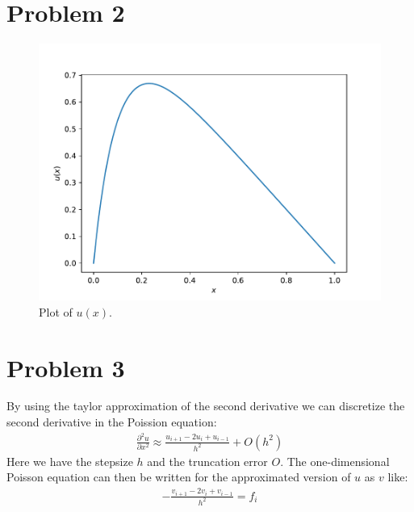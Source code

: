 \documentclass[english,notitlepage]{revtex4-1}  %
\begin{document}
\section*{Problem 2}
\begin{figure}[H]
  \includegraphics{../figures/x_u_plot.pdf}
  \caption{Plot of $u(x)$.}
  \label{tab:output_table}
\end{figure}

\section*{Problem 3}
By using the taylor approximation of the second derivative we can discretize the second derivative in the Poission equation:
\begin{align*}
  \frac{\partial^2 u }{\partial x^2} \approx \frac{u_{i+1} - 2 u_i + u_{i-1}}{h^2} + O(h^2)
\end{align*}
Here we have the stepsize $h$ and the truncation error $O$. The one-dimensional Poisson equation can then be written for the approximated version of $u$ as $v$ like:
\begin{align}
    -\frac{v_{i+1} - 2 v_i + v_{i-1}}{h^2} = f_i
    \label{eq:poiss_disc}
\end{align}
\end{document}
